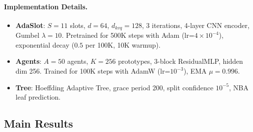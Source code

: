 \documentclass{article}
\begin{document}
\paragraph{Implementation Details.}
\begin{itemize}
    \item \textbf{AdaSlot}: $S=11$ slots, $d=64$, $d_{kvq}=128$, 3 iterations, 4-layer CNN encoder, Gumbel $\lambda=10$. Pretrained for 500K steps with Adam (lr=$4\times10^{-4}$), exponential decay ($0.5$ per 100K, 10K warmup).
    \item \textbf{Agents}: $A=50$ agents, $K=256$ prototypes, 3-block ResidualMLP, hidden dim 256. Trained for 100K steps with AdamW (lr=$10^{-3}$), EMA $\mu=0.996$.
    \item \textbf{Tree}: Hoeffding Adaptive Tree, grace period 200, split confidence $10^{-5}$, NBA leaf prediction.
\end{itemize}

\subsection{Main Results}
\end{document}
